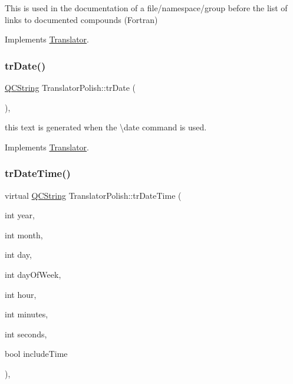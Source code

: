 This is used in the documentation of a file/namespace/group before the list of links to documented compounds (Fortran) 

Implements \mbox{\hyperlink{class_translator}{Translator}}.

\mbox{\label{class_translator_polish_a3e7bf0ac2c5231a890e4f4ad557834d0}} 
\subsubsection{\texorpdfstring{trDate()}{trDate()}}
{\footnotesize\ttfamily \mbox{\hyperlink{class_q_c_string}{Q\+C\+String}} Translator\+Polish\+::tr\+Date (\begin{DoxyParamCaption}{ }\end{DoxyParamCaption})\hspace{0.3cm}{\ttfamily [inline]}, {\ttfamily [virtual]}}

this text is generated when the \textbackslash{}date command is used. 

Implements \mbox{\hyperlink{class_translator}{Translator}}.

\mbox{\label{class_translator_polish_a1e1a6d5b779d7b0d73863691810b31d9}} 
\subsubsection{\texorpdfstring{trDateTime()}{trDateTime()}}
{\footnotesize\ttfamily virtual \mbox{\hyperlink{class_q_c_string}{Q\+C\+String}} Translator\+Polish\+::tr\+Date\+Time (\begin{DoxyParamCaption}\item[{int}]{year,  }\item[{int}]{month,  }\item[{int}]{day,  }\item[{int}]{day\+Of\+Week,  }\item[{int}]{hour,  }\item[{int}]{minutes,  }\item[{int}]{seconds,  }\item[{bool}]{include\+Time }\end{DoxyParamCaption})\hspace{0.3cm}{\ttfamily [inline]}, {\ttfamily [virtual]}}

